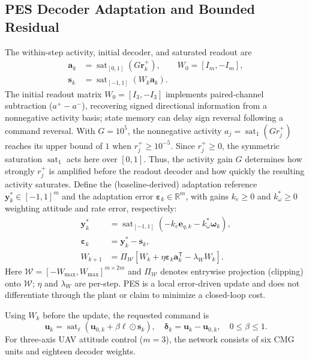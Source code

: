 \documentclass[letterpaper, 10 pt, conference]{ieeeconf}
\newcommand{\R}{\mathbb R}
\newcommand{\T}{^{\mathsf T}}
\newcommand{\sat}{\operatorname{sat}}
\begin{document}
\subsection{PES Decoder Adaptation and Bounded Residual}

The within-step activity, initial decoder, and saturated readout are
\begin{equation}
 \begin{aligned}
 \bm a_k&=\sat_{[0,1]}(G\bm r_k^+),\qquad W_0=[I_m,-I_m],\\
 \bm s_k&=\sat_{[-1,1]}(W_k\bm a_k).
 \end{aligned}
 \label{eq:readout}
\end{equation}
The initial readout matrix $W_0=[I_3,-I_3]$ implements paired-channel
subtraction ($a^+-a^-$), recovering signed directional information from
a nonnegative activity basis; state memory can delay sign reversal
following a command reversal. With $G=10^5$, the nonnegative activity
$a_j=\sat_{1}(G r_j^+)$ reaches its upper bound of $1$
when $r_j^+\ge10^{-5}$. Since $r_j^+\ge0$, the symmetric
saturation $\sat_{1}$ acts here over $[0,1]$. Thus, the activity
gain $G$ determines how strongly $r_j^+$ is amplified before the
readout decoder and how quickly the resulting activity saturates. Define the (baseline-derived) adaptation reference $\bm y_k^*\in[-1,1]^m$ and the adaptation error $\bm\varepsilon_k\in\R^m$, with gains $k_e\ge0$ and $k_\omega^*\ge0$ weighting attitude and rate error, respectively:
\begin{align}
 \bm y_k^*&=\sat_{[-1,1]}(-k_e\bm e_{q,k}-k_\omega^*\bm\omega_k),\\
 \bm\varepsilon_k&=\bm y_k^*-\bm s_k,\\
 W_{k+1}&=\Pi_{\mathcal W}
       [W_k+\eta\bm\varepsilon_k\bm a_k\T-\lambda_W W_k].
 \label{eq:pes}
\end{align}
Here $\mathcal W=[-W_{\max},W_{\max}]^{m\times2m}$ and $\Pi_{\mathcal W}$ denotes entrywise projection (clipping) onto $\mathcal W$; $\eta$ and $\lambda_W$ are per-step. PES is a local error-driven update and does not differentiate through the plant or claim to minimize a closed-loop cost.

Using $W_k$ before the update, the requested command is
\begin{equation}
 \bm u_k=\sat_{\bm\ell}(\bm u_{0,k}+\beta\bm\ell\odot\bm s_k),\quad
 \bm\delta_k=\bm u_k-\bm u_{0,k},\quad 0\le\beta\le1.
 \label{eq:residual}
\end{equation}
For three-axis UAV attitude control ($m=3$), the network consists of
six CMG units and eighteen decoder weights.
\end{document}
